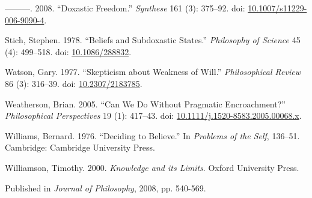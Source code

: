 \documentclass[
  10pt,
  letterpaper,
  DIV=11,
  numbers=noendperiod,
  twoside]{scrartcl}
\newlength{\cslhangindent}
\newenvironment{CSLReferences}[2] %
 {\begin{list}{}{%
  \setlength{\itemindent}{0pt}
  \setlength{\leftmargin}{0pt}
  \setlength{\parsep}{0pt}
  \ifodd #1
   \setlength{\leftmargin}{\cslhangindent}
   \setlength{\itemindent}{-1\cslhangindent}
  \fi
  \setlength{\itemsep}{#2\baselineskip}}}
 {\end{list}}
\begin{document}
\begin{CSLReferences}{1}{0}
---------. 2008. {``Doxastic Freedom.''} \emph{Synthese} 161 (3):
375--92. doi:
\href{https://doi.org/10.1007/s11229-006-9090-4}{10.1007/s11229-006-9090-4}.

Stich, Stephen. 1978. {``Beliefs and Subdoxastic States.''}
\emph{Philosophy of Science} 45 (4): 499--518. doi:
\href{https://doi.org/10.1086/288832}{10.1086/288832}.

Watson, Gary. 1977. {``Skepticism about Weakness of Will.''}
\emph{Philosophical Review} 86 (3): 316--39. doi:
\href{https://doi.org/10.2307/2183785}{10.2307/2183785}.

Weatherson, Brian. 2005. {``{Can We Do Without Pragmatic
Encroachment?}''} \emph{Philosophical Perspectives} 19 (1): 417--43.
doi:
\href{https://doi.org/10.1111/j.1520-8583.2005.00068.x}{10.1111/j.1520-8583.2005.00068.x}.

Williams, Bernard. 1976. {``Deciding to Believe.''} In \emph{Problems of
the Self}, 136--51. Cambridge: Cambridge University Press.

Williamson, Timothy. 2000. \emph{{Knowledge and its Limits}}. Oxford
University Press.

\end{CSLReferences}



\noindent Published in\emph{
Journal of Philosophy}, 2008, pp. 540-569.
\end{document}
